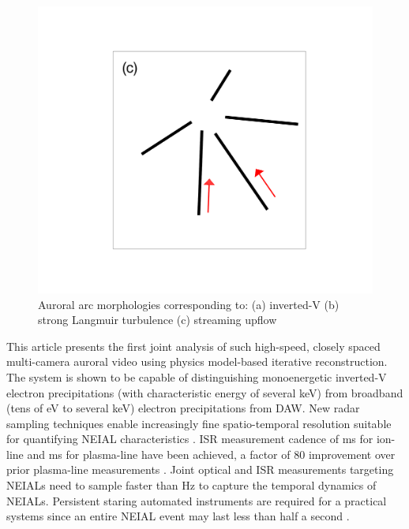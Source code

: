 \begin{figure}
\begin{minipage}{0.3\textwidth}
	\end{minipage}
	\begin{minipage}{0.3\textwidth}\centering
		\includegraphics[width=0.9\columnwidth,trim=150 100 150 100,clip]{gfx/aurora_ray}
	\end{minipage}
	\caption{Auroral arc morphologies corresponding to: 
		(a) inverted-V 
		(b) strong Langmuir turbulence 
		(c) streaming upflow}
	\label{fig:cartoonmorph}
\end{figure}
This article presents the first joint analysis of such high-speed, closely spaced multi-camera auroral video using physics model-based iterative reconstruction.
The system is shown to be capable of distinguishing monoenergetic inverted-V electron precipitations (with characteristic energy of several keV) from broadband (tens of eV to several keV) electron precipitations from DAW.
New radar sampling techniques \citep{swoboda2015} enable increasingly fine spatio-temporal resolution suitable for quantifying NEIAL characteristics \citep{schlatter2015}.
ISR measurement cadence of \unit[12]{ms} for ion-line \citep{michell2010} and \unit[200]{ms} for plasma-line \citep{vierinen2016} have been achieved, a factor of 80 improvement over prior plasma-line measurements \citep{nicolls2006}.
Joint optical and ISR measurements targeting NEIALs need to sample faster than \unit[40]{Hz} to capture the temporal dynamics of NEIALs.
Persistent staring automated instruments are required for a practical systems since an entire NEIAL event may last less than half a second \citep{dahlgren2013}.

